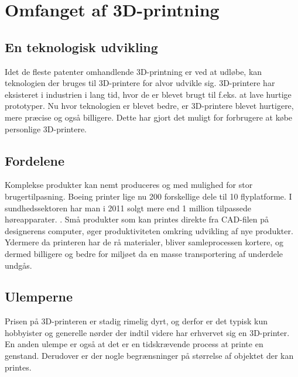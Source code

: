 \chapter{Omfanget af 3D-printning} %
\label{cha:omfanget_af_3d_printer}

\section{En teknologisk udvikling} %
\label{par:en_teknologisk_udvikling}



Idet de fleste patenter omhandlende 3D-printning er ved at udløbe, kan teknologien der bruges til 3D-printere for alvor udvikle sig. 3D-printere har eksisteret i industrien i lang tid, hvor de er blevet brugt til f.eks. at lave hurtige prototyper. Nu hvor teknologien er blevet bedre, er 3D-printere blevet hurtigere, mere præcise og også billigere. Dette har gjort det muligt for forbrugere at købe personlige 3D-printere. 


\section{Fordelene} %
\label{sec:fordelene}


Komplekse produkter kan nemt produceres og med mulighed for stor brugertilpasning. Boeing printer lige nu 200 forskellige dele til 10 flyplatforme. I sundhedssektoren har man i 2011 solgt mere end 1 million tilpassede høreapparater. \cite{manyika_disruptive_2013}. Små produkter som kan printes direkte fra CAD-filen på designerens computer, øger produktiviteten omkring udvikling af nye produkter. Ydermere da printeren har de rå materialer, bliver samleprocessen kortere, og dermed billigere og bedre for miljøet da en masse transportering af underdele undgås.


\section{Ulemperne} %
\label{par:ulemperne}


Prisen på 3D-printeren er stadig rimelig dyrt, og derfor er det typisk kun hobbyister og generelle nørder der indtil videre har erhvervet sig en 3D-printer. En anden ulempe er også at det er en tidskrævende process at printe en genstand. Derudover er der nogle begrænsninger på størrelse af objektet der kan printes.


